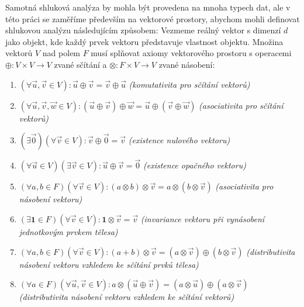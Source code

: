 Samotná shluková analýza by mohla být provedena na mnoha typech dat, ale v této práci se zaměříme především na vektorové prostory, abychom mohli definovat shlukovou analýzu následujícím způsobem: Vezmeme reálný vektor s dimenzí $d$ jako objekt, kde každý prvek vektoru představuje vlastnost objektu. Množina vektorů $V$ nad polem $F$ musí splňovat axiomy vektorového prostoru s operacemi $\oplus: V \times V \to V$ zvané sčítání a $\otimes:F \times V \to V$ zvané násobení:
\begin{enumerate}
\item $(\forall \vec{u}, \vec{v} \in V):\vec{u} \oplus \vec{v} = \vec{v} \oplus \vec{u}$ \textit{(komutativita pro sčítání vektorů)}
\item $(\forall \vec{u}, \vec{v}, \vec{w} \in V):(\vec{u} \oplus \vec{v}) \oplus \vec{w} = \vec{u} \oplus (\vec{v} \oplus \vec{w})$ \textit{(asociativita pro sčítání vektorů)}
\item $(\exists \vec{0})(\forall \vec{v} \in V):\vec{v} \oplus \vec{0} = \vec{v}$ \textit{(existence nulového vektoru)}
\item $(\forall \vec{u} \in V)(\exists \vec{v} \in V):\vec{u} \oplus \vec{v} = \vec{0}$ \textit{(existence opačného vektoru)}
\item $(\forall a,b \in F)(\forall \vec{v} \in V):(a \otimes b) \otimes \vec{v} = a \otimes (b \otimes \vec{v})$ \textit{(asociativita pro násobení vektoru)}
\item $(\exists \textbf{1} \in F)(\forall \vec{v} \in V):\textbf{1} \otimes \vec{v} = \vec{v}$ \textit{(invariance vektoru při vynásobení jednotkovým prvkem tělesa)}
\item $(\forall a,b \in F)(\forall \vec{v} \in V):(a + b) \otimes \vec{v} = (a \otimes \vec{v}) \oplus (b \otimes \vec{v})$ \textit{(distributivita násobení vektoru vzhledem ke sčítání prvků tělesa)}
\item $(\forall a \in F)(\forall \vec{u}, \vec{v} \in V):a \otimes (\vec{u} \oplus \vec{v}) = (a \otimes \vec{u}) \oplus (a \otimes \vec{v})$ \textit{(distributivita násobení vektoru vzhledem ke sčítání vektorů)}
\end{enumerate}

